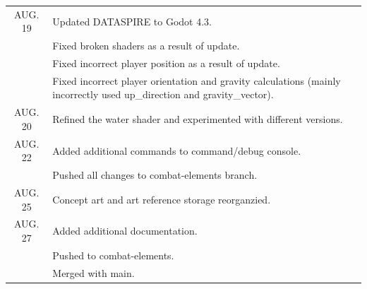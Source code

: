 \documentclass[legalpaper]{ltxdoc}
\begin{document}
\begin{tabular}{ c|m{16cm} }
		\hline
		AUG. 19 & Updated DATASPIRE to Godot 4.3. \\
		& Fixed broken shaders as a result of update. \\
		& Fixed incorrect player position as a result of update. \\
		& Fixed incorrect player orientation and gravity calculations (mainly incorrectly used up_direction and gravity_vector). \\
		\hline
		AUG. 20 & Refined the water shader and experimented with different versions. \\
		\hline
		AUG. 22 & Added additional commands to command/debug console. \\
		& Pushed all changes to combat-elements branch. \\
		\hline
		AUG. 25 & Concept art and art reference storage reorganzied. \\
		\hline
		AUG. 27 & Added additional documentation. \\
		& Pushed to combat-elements. \\
		& Merged with main. \\
		\hline
	\end{tabular}
	
\end{document}
